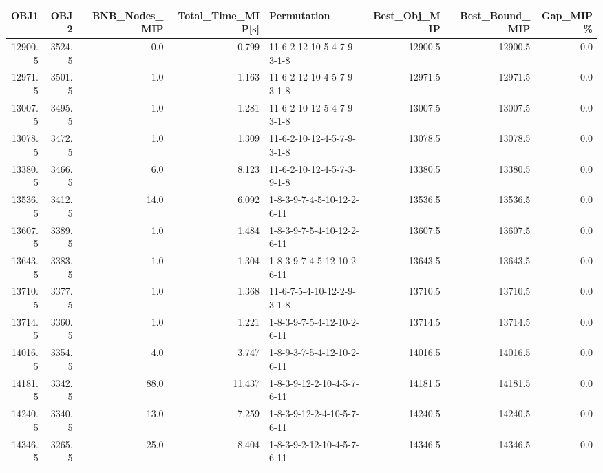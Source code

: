 \begin{tabular}{rrrrlrrr}
\toprule
    OBJ1 &    OBJ2 &  BNB\_Nodes\_MIP &  Total\_Time\_MIP[s] &                 Permutation &  Best\_Obj\_MIP &  Best\_Bound\_MIP &  Gap\_MIP\% \\
\midrule
 12900.5 &  3524.5 &            0.0 &              0.799 &  11-6-2-12-10-5-4-7-9-3-1-8 &       12900.5 &         12900.5 &       0.0 \\
 12971.5 &  3501.5 &            1.0 &              1.163 &  11-6-2-12-10-4-5-7-9-3-1-8 &       12971.5 &         12971.5 &       0.0 \\
 13007.5 &  3495.5 &            1.0 &              1.281 &  11-6-2-10-12-5-4-7-9-3-1-8 &       13007.5 &         13007.5 &       0.0 \\
 13078.5 &  3472.5 &            1.0 &              1.309 &  11-6-2-10-12-4-5-7-9-3-1-8 &       13078.5 &         13078.5 &       0.0 \\
 13380.5 &  3466.5 &            6.0 &              8.123 &  11-6-2-10-12-4-5-7-3-9-1-8 &       13380.5 &         13380.5 &       0.0 \\
 13536.5 &  3412.5 &           14.0 &              6.092 &  1-8-3-9-7-4-5-10-12-2-6-11 &       13536.5 &         13536.5 &       0.0 \\
 13607.5 &  3389.5 &            1.0 &              1.484 &  1-8-3-9-7-5-4-10-12-2-6-11 &       13607.5 &         13607.5 &       0.0 \\
 13643.5 &  3383.5 &            1.0 &              1.304 &  1-8-3-9-7-4-5-12-10-2-6-11 &       13643.5 &         13643.5 &       0.0 \\
 13710.5 &  3377.5 &            1.0 &              1.368 &  11-6-7-5-4-10-12-2-9-3-1-8 &       13710.5 &         13710.5 &       0.0 \\
 13714.5 &  3360.5 &            1.0 &              1.221 &  1-8-3-9-7-5-4-12-10-2-6-11 &       13714.5 &         13714.5 &       0.0 \\
 14016.5 &  3354.5 &            4.0 &              3.747 &  1-8-9-3-7-5-4-12-10-2-6-11 &       14016.5 &         14016.5 &       0.0 \\
 14181.5 &  3342.5 &           88.0 &             11.437 &  1-8-3-9-12-2-10-4-5-7-6-11 &       14181.5 &         14181.5 &       0.0 \\
 14240.5 &  3340.5 &           13.0 &              7.259 &  1-8-3-9-12-2-4-10-5-7-6-11 &       14240.5 &         14240.5 &       0.0 \\
 14346.5 &  3265.5 &           25.0 &              8.404 &  1-8-3-9-2-12-10-4-5-7-6-11 &       14346.5 &         14346.5 &       0.0 \\

\end{tabular}

